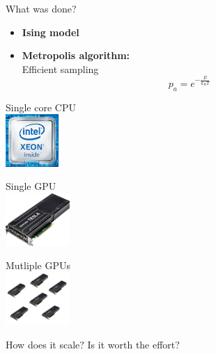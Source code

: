 \documentclass{beamer}
\begin{document}
\begin{frame}{What was done?}
    \begin{itemize}
        \item \textbf{Ising model}
            \noindent \ising
        \item \textbf{Metropolis algorithm:}\\
            Efficient sampling
            \begin{equation*}
                p_a = e^{-\frac{E}{k_B T}}
            \end{equation*}
    \end{itemize} \pause
    \vspace{5mm}
    \begin{minipage}{0.2\paperwidth}
        Single core CPU\\
        \includegraphics[keepaspectratio=true, height=2cm]{images/intel_xeon.jpg}
    \end{minipage} \pause
    \hfill
    \begin{minipage}{0.2\paperwidth}
        Single GPU\\
        \includegraphics[keepaspectratio=true, height=2cm]{images/gpu_modified.png}
    \end{minipage} \pause
    \hfill
    \begin{minipage}{0.3\paperwidth}
        Mutliple GPUs\\
        \includegraphics[keepaspectratio=true, height=2cm]{images/multi_gpu.png}
    \end{minipage} \pause
\begin{highlightbox}
    How does it scale? Is it worth the effort?
\end{highlightbox}
\end{frame}
\end{document}
